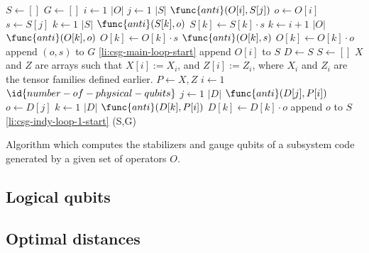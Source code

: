 \documentclass[twocolumn,showpacs,preprintnumbers,amsmath,amssymb,nofootinbib,pra,floatfix]{revtex4}
\begin{document}
\begin{table*}
\label{SG-algorithm}
\begin{codebox}
\li $S \gets []$
\li $G\gets []$
\li \For $i \gets 1$ \To $|O|$ \label{li:csg-main-loop-start}
\li \Do
\li      \For $j \gets 1$ \To $|S|$
\li      \Do
\li        \If $\func{anti}(O[i],S[j])$
\li        \Then
\li              $o \gets O[i]$
\li              $s \gets S[j]$
\li               \For $k \gets 1$ \To $|S|$
\li                   \Do
\li                        {} $\func{anti}(S[k],o)$  $S[k] \gets S[k]\cdot s$
                       \End 
\li               \For $k \gets i+1$ \To $|O|$
\li                  \Do
\li                        {} $\func{anti}(O[k],o)$  $O[k] \gets O[k]\cdot s$
\li                        {} $\func{anti}(O[k],s)$  $O[k] \gets O[k]\cdot o$
                       \End
\li             append $(o,s)$ to $G$
\li             \Goto \ref{li:csg-main-loop-start}
              \End
            \End
\li      append $O[i]$ to $S$
      \End
\li $D \gets S$
\li $S \gets []$
\zi \Comment $X$ and $Z$ are arrays such that
  $X[i]:=X_i$, and $Z[i]:=Z_i$, where $X_i$ and $Z_i$ are the tensor
  families defined earlier.
\li \For $P\gets X,Z$
\li \Do %
\li   \For $i \gets 1$ \To $\id{number-of-physical-qubits}$ \label{li:csg-indy-loop-1-start}
\li   \Do %
\li     \For $j \gets 1$ \To $|D|$
\li     \Do %
\li         \If $\func{anti}(D[j],P[i])$
\li         \Then
\li            $o \gets D[j]$
\li             \For $k \gets 1$ \To $|D|$
\li             \Do %
\li                 {} $\func{anti}(D[k],P[i])$  $D[k] \gets D[k]\cdot o$
                 \End %
\li             append $o$ to $S$
\li            \Goto \ref{li:csg-indy-loop-1-start}
              \End %
           \End %
          \End %
        \End %
\li \Return (S,G)
\end{codebox}
\caption{Algorithm which computes the stabilizers and gauge qubits of
  a subsystem code generated by a given set of operators $O$.}
\end{table*}
\subsection{Logical qubits}

\label{logical-qubits}
\subsection{Optimal distances}

\label{optimal-distances}
\end{document}
